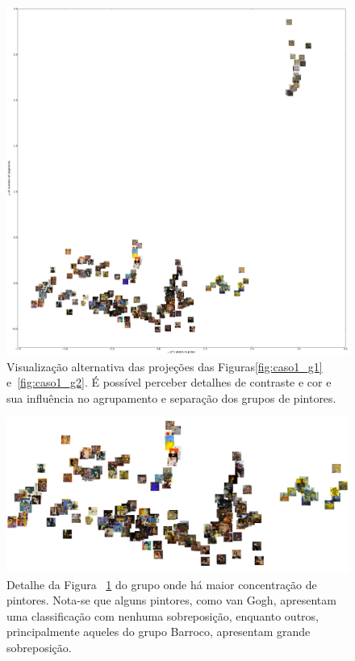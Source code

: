 \begin{figure}[h!]
  \begin{center}
    \includegraphics[width=\textwidth]{figs/caso1_g1_alternativo.pdf}
  \end{center}
  \caption{Visualização alternativa das projeções das Figuras\ref{fig:caso1_g1}
    e~\ref{fig:caso1_g2}. É possível perceber detalhes de contraste e cor e sua
    influência no agrupamento e separação dos grupos de pintores.}
  \label{fig:alternativa}
\end{figure}

\begin{figure}[h!]
  \begin{center}
    \includegraphics[width=\textwidth]{figs/detalhe1.pdf}
  \end{center}
  \caption{Detalhe da Figura ~\ref{fig:alternativa} do grupo onde há maior
    concentração de pintores. Nota-se que alguns pintores, como van Gogh,
    apresentam uma classificação com nenhuma sobreposição, enquanto outros,
    principalmente aqueles do grupo Barroco, apresentam grande sobreposição.}
  \label{fig:alternativa1}
\end{figure}

